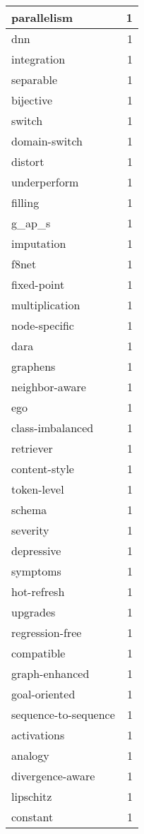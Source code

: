 \begin{table}[h]
\begin{tabular}{|l|r|}
\hline
parallelism & 1 \\
\hline
dnn & 1 \\
\hline
integration & 1 \\
\hline
separable & 1 \\
\hline
bijective & 1 \\
\hline
switch & 1 \\
\hline
domain-switch & 1 \\
\hline
distort & 1 \\
\hline
underperform & 1 \\
\hline
filling & 1 \\
\hline
g_ap_s & 1 \\
\hline
imputation & 1 \\
\hline
f8net & 1 \\
\hline
fixed-point & 1 \\
\hline
multiplication & 1 \\
\hline
node-specific & 1 \\
\hline
dara & 1 \\
\hline
graphens & 1 \\
\hline
neighbor-aware & 1 \\
\hline
ego & 1 \\
\hline
class-imbalanced & 1 \\
\hline
retriever & 1 \\
\hline
content-style & 1 \\
\hline
token-level & 1 \\
\hline
schema & 1 \\
\hline
severity & 1 \\
\hline
depressive & 1 \\
\hline
symptoms & 1 \\
\hline
hot-refresh & 1 \\
\hline
upgrades & 1 \\
\hline
regression-free & 1 \\
\hline
compatible & 1 \\
\hline
graph-enhanced & 1 \\
\hline
goal-oriented & 1 \\
\hline
sequence-to-sequence & 1 \\
\hline
activations & 1 \\
\hline
analogy & 1 \\
\hline
divergence-aware & 1 \\
\hline
lipschitz & 1 \\
\hline
constant & 1 \\
\hline

\end{tabular}
\end{table}
